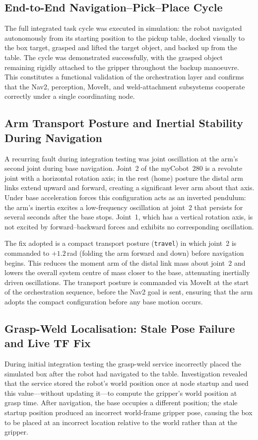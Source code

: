 \subsection{End-to-End Navigation--Pick--Place Cycle}
The full integrated task cycle was executed in simulation: the robot navigated
autonomously from its starting position to the pickup table, docked visually to
the box target, grasped and lifted the target object, and backed up from the
table. The cycle was demonstrated successfully, with the grasped object remaining
rigidly attached to the gripper throughout the backup manoeuvre. This constitutes
a functional validation of the orchestration layer and confirms that the Nav2,
perception, MoveIt, and weld-attachment subsystems cooperate correctly under a
single coordinating node.

\subsection{Arm Transport Posture and Inertial Stability During Navigation}
A recurring fault during integration testing was joint oscillation at the arm's
second joint during base navigation. Joint~2 of the myCobot~280 is a revolute
joint with a horizontal rotation axis; in the rest (home) posture the distal arm
links extend upward and forward, creating a significant lever arm about that axis.
Under base acceleration forces this configuration acts as an inverted pendulum:
the arm's inertia excites a low-frequency oscillation at joint~2 that persists
for several seconds after the base stops. Joint~1, which has a vertical rotation
axis, is not excited by forward--backward forces and exhibits no corresponding
oscillation.

The fix adopted is a compact transport posture (\texttt{travel}) in which joint~2
is commanded to $+1.2$\,rad (folding the arm forward and down) before navigation
begins. This reduces the moment arm of the distal link mass about joint~2 and
lowers the overall system centre of mass closer to the base, attenuating inertially
driven oscillations. The transport posture is commanded via MoveIt at the start of
the orchestration sequence, before the Nav2 goal is sent, ensuring that the arm
adopts the compact configuration before any base motion occurs.

\subsection{Grasp-Weld Localisation: Stale Pose Failure and Live TF Fix}
During initial integration testing the grasp-weld service incorrectly placed the
simulated box after the robot had navigated to the table. Investigation revealed
that the service stored the robot's world position once at node startup and used
this value---without updating it---to compute the gripper's world position at grasp
time. After navigation, the base occupies a different position; the stale startup
position produced an incorrect world-frame gripper pose, causing the box to be
placed at an incorrect location relative to the world rather than at the gripper.

